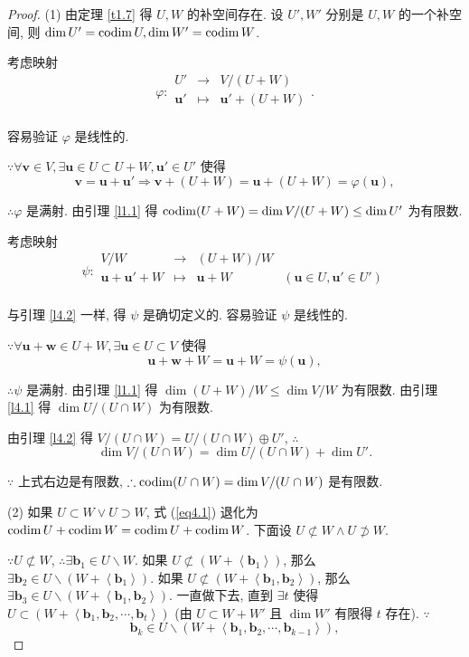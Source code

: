 \documentclass[color=black,device=normal,lang=cn,mode=geye]{elegantnote}
\begin{document}
\begin{proof}
    (1) 由定理 \ref{t1.7} 得 $U,W$ 的补空间存在. 设 $U',W'$ 分别是 $U,W$ 的一个补空间, 则 $\dim U'=\operatorname{codim} U,\dim W'=\operatorname{codim} W$.

    考虑映射
    \[\varphi:\begin{array}{rcl}
        U' & \to & V/(U+W) \\
        \boldsymbol{u}' & \mapsto & \boldsymbol{u}'+(U+W) \\
    \end{array}.\]
    
    容易验证 $\varphi$ 是线性的.

    $\because\forall\boldsymbol{v}\in V,\exists\boldsymbol{u}\in U\subset U+W,\boldsymbol{u}'\in U'$ 使得
    \[\boldsymbol{v}=\boldsymbol{u}+\boldsymbol{u}'\Rightarrow\boldsymbol{v}+(U+W)=\boldsymbol{u}+(U+W)=\varphi(\boldsymbol{u}),\]

    $\therefore\varphi$ 是满射. 由引理 \ref{l1.1} 得 $\operatorname{codim}(U+W)=\dim V/(U+W)\leq\dim U'$ 为有限数.

    考虑映射
    \[\psi:\begin{array}{rcll}
        V/W & \to & (U+W)/W \\
        \boldsymbol{u}+\boldsymbol{u}'+W & \mapsto & \boldsymbol{u}+W & (\boldsymbol{u}\in U,\boldsymbol{u}'\in U') \\
    \end{array}\]

    与引理 \ref{l4.2} 一样, 得 $\psi$ 是确切定义的. 容易验证 $\psi$ 是线性的.

    $\because\forall\boldsymbol{u}+\boldsymbol{w}\in U+W,\exists\boldsymbol{u}\in U\subset V$ 使得
    \[\boldsymbol{u}+\boldsymbol{w}+W=\boldsymbol{u}+W=\psi(\boldsymbol{u}),\]

    $\therefore\psi$ 是满射. 由引理 \ref{l1.1} 得 $\dim(U+W)/W\leq\dim  V/W$ 为有限数. 由引理 \ref{l4.1} 得 $\dim U/(U\cap W)$ 为有限数.

    由引理 \ref{l4.2} 得 $V/(U\cap W)=U/(U\cap W)\oplus U'$, $\therefore$
    \[\dim V/(U\cap W)=\dim U/(U\cap W)+\dim U'.\]

    $\because$ 上式右边是有限数, $\therefore\operatorname{codim}(U\cap W)=\dim V/(U\cap W)$ 是有限数.

    (2) 如果 $U\subset W\vee U\supset W$, 式 (\ref{eq4.1}) 退化为 $\operatorname{codim} U+\operatorname{codim} W=\operatorname{codim} U+\operatorname{codim} W$. 下面设 $U\not\subset W\wedge U\not\supset W$.

    $\because U\not\subset W$, $\therefore\exists\boldsymbol{b}_1\in U\backslash W$. 如果 $U\not\subset(W+\left<\boldsymbol{b}_1\right>)$, 那么 $\exists\boldsymbol{b}_2\in U\backslash(W+\left<\boldsymbol{b}_1\right>)$. 如果 $U\not\subset(W+\left<\boldsymbol{b}_1,\boldsymbol{b}_2\right>)$, 那么 $\exists\boldsymbol{b}_3\in U\backslash(W+\left<\boldsymbol{b}_1,\boldsymbol{b}_2\right>)$. 一直做下去, 直到 $\exists t$ 使得 $U\subset(W+\left<\boldsymbol{b}_1,\boldsymbol{b}_2,\cdots,\boldsymbol{b}_t\right>)$ (由 $U\subset W+W'$ 且 $\dim W'$ 有限得 $t$ 存在). $\because$
    \[\boldsymbol{b}_k\in U\backslash(W+\left<\boldsymbol{b}_1,\boldsymbol{b}_2,\cdots,\boldsymbol{b}_{k-1}\right>),\]


\end{proof}
\end{document}

